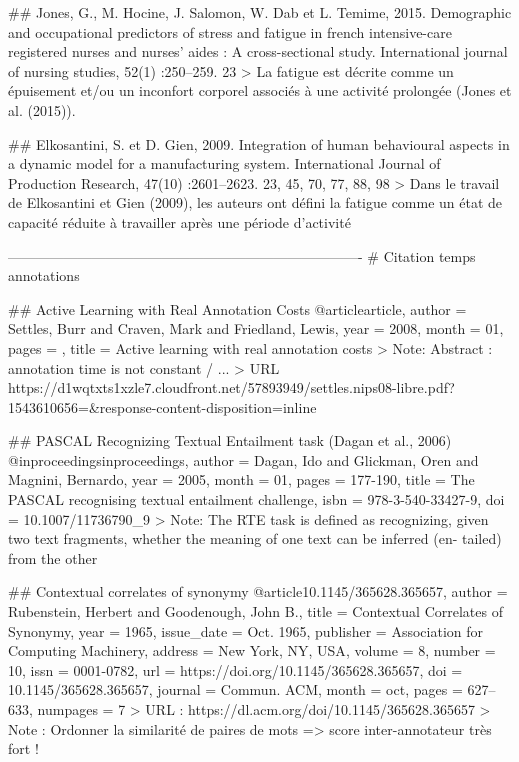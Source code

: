 	## Jones, G., M. Hocine, J. Salomon, W. Dab et L. Temime, 2015. Demographic and occupational predictors of stress and fatigue in french intensive-care registered nurses and nurses’ aides : A cross-sectional study. International journal of nursing studies, 52(1) :250–259. 23
	> La fatigue est décrite comme un épuisement et/ou un inconfort corporel associés à une activité prolongée (Jones et al. (2015)).

	## Elkosantini, S. et D. Gien, 2009. Integration of human behavioural aspects in a dynamic model for a manufacturing system. International Journal of Production Research, 47(10) :2601–2623. 23, 45, 70, 77, 88, 98
	> Dans le travail de Elkosantini et Gien (2009), les auteurs ont défini la fatigue comme un état de capacité réduite à travailler après une période d’activité

----------------------------------------------------------------------------
# Citation temps annotations
				
	## Active Learning with Real Annotation Costs
	@article{article,
		author = {Settles, Burr and Craven, Mark and Friedland, Lewis},
		year = {2008},
		month = {01},
		pages = {},
		title = {Active learning with real annotation costs}
	}
	> Note: Abstract : annotation time is not constant / ...
	> URL https://d1wqtxts1xzle7.cloudfront.net/57893949/settles.nips08-libre.pdf?1543610656=&response-content-disposition=inline%
	
	
	## PASCAL Recognizing Textual Entailment task (Dagan et al., 2006)
	@inproceedings{inproceedings,
		author = {Dagan, Ido and Glickman, Oren and Magnini, Bernardo},
		year = {2005},
		month = {01},
		pages = {177-190},
		title = {The PASCAL recognising textual entailment challenge},
		isbn = {978-3-540-33427-9},
		doi = {10.1007/11736790_9}
	}
	> Note: The RTE task is defined as recognizing, given two text fragments, whether the meaning of one text can be inferred (en- tailed) from the other
	
	
	## Contextual correlates of synonymy
	@article{10.1145/365628.365657,
		author = {Rubenstein, Herbert and Goodenough, John B.},
		title = {Contextual Correlates of Synonymy},
		year = {1965},
		issue_date = {Oct. 1965},
		publisher = {Association for Computing Machinery},
		address = {New York, NY, USA},
		volume = {8},
		number = {10},
		issn = {0001-0782},
		url = {https://doi.org/10.1145/365628.365657},
		doi = {10.1145/365628.365657},
		journal = {Commun. ACM},
		month = {oct},
		pages = {627–633},
		numpages = {7}
	}
	> URL : https://dl.acm.org/doi/10.1145/365628.365657
	> Note : Ordonner la similarité de paires de mots => score inter-annotateur très fort !
	
